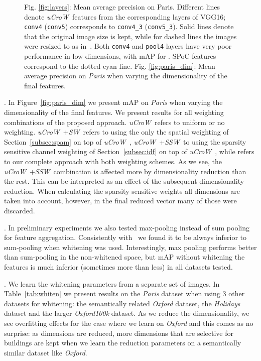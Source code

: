 \documentclass[runningheads]{llncs}
\newcommand{\uCrow}{\textit{uCroW}~}
\newcommand{\sCrow}{\textit{SW}~} \newcommand{\cCrow}{\textit{SSW}~}
\begin{document}
\begin{figure}[t]
\caption{Fig. \ref{fig:layers}: Mean average precision on Paris. Different lines denote \uCrow features from the corresponding layers of VGG16; \texttt{conv4} (\texttt{conv5}) corresponds to \texttt{conv4\_3} (\texttt{conv5\_3}). Solid lines denote that the original image size is kept, while for dashed lines the images were resized to  as in~\cite{BaLe15}.  Both \texttt{conv4} and \texttt{pool4} layers have very poor performance in low dimensions, with  mAP for . SPoC features~\cite{BaLe15} correspond to the dotted cyan line. Fig. \ref{fig:paris_dim}: Mean average precision on \emph{Paris} when varying the dimensionality of the final features.}

\end{figure}






.
In Figure~\ref{fig:paris_dim} we present mAP on \emph{Paris} when varying the dimensionality of the final features. We present results for all weighting combinations of the proposed approach. \uCrow refers to uniform or no weighting. \uCrow+\sCrow refers to using the only the spatial weighting of Section~\ref{subsec:spam} on top of \uCrow, \uCrow+\cCrow to using the sparsity sensitive channel weighting of Section~\ref{subsec:idf} on top of \uCrow, while \Crow refers to our complete approach with both weighting schemes. As we see, the \uCrow+\cCrow combination is affected more by dimensionality reduction than the rest. This can be interpreted as an effect of the subsequent dimensionality reduction. When calculating the sparsity sensitive weights all dimensions are taken into account, however, in the final reduced vector many of those were discarded. 











.
In preliminary experiments we also tested  max-pooling instead of sum pooling for feature aggregation. Consistently with~\cite{BaLe15} we found it to be always inferior to sum-pooling when whitening was used. Interestingly, max pooling performs better than sum-pooling in the non-whitened space, but mAP without whitening the features is much inferior (sometimes more than  less) in all datasets tested.

. We learn the whitening parameters from a separate set of images. In Table~\ref{tab:whiten} we present results on the \emph{Paris} dataset when using 3 other datasets for whitening: the semantically related \emph{Oxford} dataset, the \emph{Holidays} dataset and the larger \emph{Oxford100k} dataset. As we reduce the dimensionality, we see overfitting effects for the case where we learn on \emph{Oxford} and this comes as no surprise: as dimensions are reduced, more dimensions that are selective for buildings are kept when we learn the reduction parameters on a semantically similar dataset like \emph{Oxford}.
\end{document}
